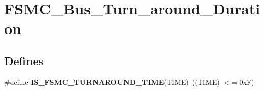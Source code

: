 \hypertarget{group__FSMC__Bus__Turn__around__Duration}{
\section{FSMC\_\-Bus\_\-Turn\_\-around\_\-Duration}
\label{group__FSMC__Bus__Turn__around__Duration}
}
\subsection*{Defines}
\begin{DoxyCompactItemize}
\item 
\hypertarget{group__FSMC__Bus__Turn__around__Duration_ga9ec626f30679a18af91bf48c52d9260d}{
\#define {\bfseries IS\_\-FSMC\_\-TURNAROUND\_\-TIME}(TIME)~((TIME) $<$= 0xF)}
\label{group__FSMC__Bus__Turn__around__Duration_ga9ec626f30679a18af91bf48c52d9260d}

\end{DoxyCompactItemize}
